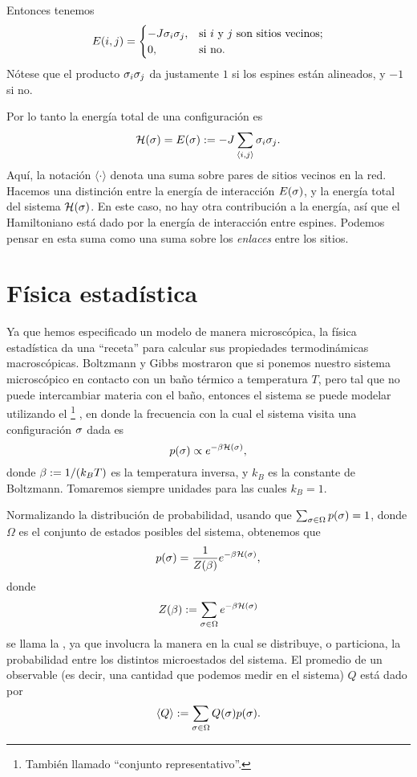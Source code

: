 Entonces tenemos
\begin{equation}
E(i,j) = \begin{cases} -J \s_i \s_j, & \text{si $i$ y $j$ son sitios vecinos;}\\
          0, & \text{si no.}
         \end{cases}
\end{equation}
Nótese que el producto $\s_i \s_j$ da justamente $1$ si los espines están
alineados, y $-1$ si no.

Por lo tanto la energía total de una configuración es
\begin{equation}
\HH(\ss) = E(\ss) \defeq -J \sum_{\langle i, j \rangle} \s_i \s_j.
\end{equation}
Aquí, la notación $\langle \cdot \rangle$ denota una suma sobre pares de sitios
vecinos en la red. Hacemos una distinción entre la energía de interacción
$E(\ss)$, y la energía total del sistema $\HH(\ss)$. En este caso, no hay otra
contribución a la energía, así que el Hamiltoniano está dado por la energía de
interacción entre espines.
Podemos pensar en esta suma como una suma sobre los
\emph{enlaces} entre los sitios.

\section{Física estadística}
Ya que hemos especificado un modelo de manera microscópica, la física
estadística da una ``receta'' para calcular sus propiedades termodinámicas
macroscópicas. Boltzmann y Gibbs mostraron que si ponemos nuestro sistema
microscópico en contacto con un baño térmico a temperatura $T$, pero tal que no
puede intercambiar materia con el baño, entonces el sistema se puede modelar
utilizando el \footnote{También llamado ``conjunto
representativo''.} , en donde
la frecuencia con la cual el
sistema visita una configuración $\ss$ dada es
\begin{equation}
 p(\ss) \propto e^{-\beta \HH(\ss)},
\end{equation}
donde $\beta \defeq 1/(k_{B} T)$ es la temperatura inversa, y $k_B$ es la
constante de Boltzmann. Tomaremos siempre unidades para las cuales $k_B = 1$.

Normalizando la distribución de probabilidad, usando que $\sum_{\ss \in \Omega}
p(\ss) = 1$, donde $\Omega$ es el conjunto de estados posibles del sistema,
obtenemos que
\begin{equation}
 p(\ss) = \frac{1}{Z(\beta)} e^{-\beta \HH(\ss)},
\end{equation}
donde 
\begin{equation}
Z(\beta) \defeq \sum_{\ss \in \Omega} e^{-\beta \HH(\ss)}
\end{equation}
se llama la , ya que involucra la manera en la
cual se distribuye, o particiona, la probabilidad entre los distintos
microestados del sistema.  El promedio de un observable (es decir, una
cantidad que podemos medir en el sistema) $Q$ está dado por
\begin{equation}
 \mean{Q} \defeq \sum_{\ss \in \Omega} Q(\ss) p(\ss).
\end{equation}


